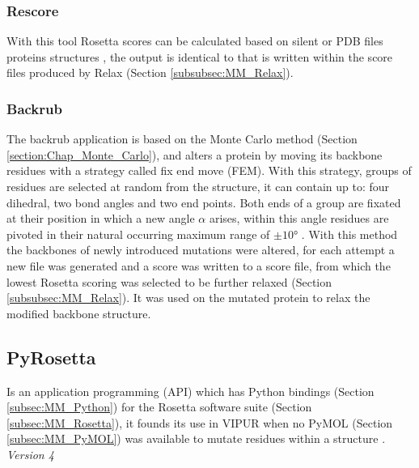 \subsubsection{Rescore}
With this tool Rosetta scores can be calculated based on silent or PDB files proteins structures \cite{} , the output is identical to that is written within the score files produced by Relax (Section \ref{subsubsec:MM_Relax}).
\label{subsubsec:MM_Rescore}

\subsubsection{Backrub}
The backrub application is based on the Monte Carlo method (Section \ref{section:Chap_Monte_Carlo}), and alters a protein by moving its backbone residues with a strategy called fix end move (FEM). With this strategy, groups of residues are selected at random from the structure, it can contain up to: four dihedral, two bond angles and two end points. Both ends of a group are fixated at their position in which a new angle $\alpha$ arises, within this angle residues are pivoted in their natural occurring maximum range of $\pm \ang{10}$ \cite{}.
With this method the backbones of newly introduced mutations were altered, for each attempt a new file was generated and a score was written to a score file, from which the lowest Rosetta scoring was selected to be further relaxed (Section \ref{subsubsec:MM_Relax}).
It was used on the mutated protein to relax the modified backbone structure.
\label{subsubsec:MM_Backrub}

\subsection{PyRosetta}
Is an application programming (API) which has Python bindings (Section \ref{subsec:MM_Python}) for the Rosetta software suite (Section \ref{subsec:MM_Rosetta}), it founds its use in VIPUR when no PyMOL (Section \ref{subsec:MM_PyMOL}) was available to mutate residues within a structure \cite{}.
\label{subsec:MM_PyRosetta}
\newline
\textit{Version 4}

